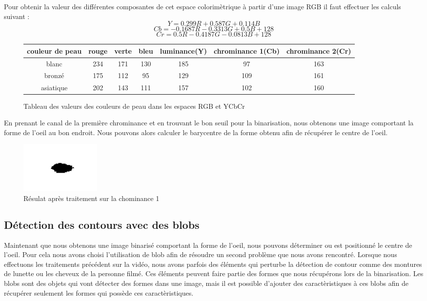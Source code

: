 Pour obtenir la valeur des différentes composantes de cet espace colorimètrique à partir
d'une image RGB il faut effectuer les calculs suivant :
$$Y = 0.299R + 0.587 G + 0.114 B$$
$$Cb = -0.1687R - 0.3313 G + 0.5B + 128$$
$$Cr = 0.5R -0.4187G -0.0813B + 128$$

\begin{figure}[H]
 \begin{tabular}{|c|c|c|c|c|c|c|}
  \hline
  couleur de peau & rouge & verte & bleu & luminance(Y) & chrominance 1(Cb) & chrominance 2(Cr)\\
  \hline
  blanc & 234 & 171 & 130 & 185 & 97 & 163 \\
  \hline
  bronzé & 175 & 112 & 95 & 129 & 109 & 161 \\
  \hline
  asiatique & 202 & 143 & 111 & 157 & 102 & 160\\
  \hline
 \end{tabular}
 \caption{Tableau des valeurs des couleurs de peau dans les espaces RGB et YCbCr}
\end{figure}


En prenant le canal de la première chrominance et en trouvant le bon seuil pour la binarisation,
nous obtenons une image comportant la forme de l'oeil au bon endroit. Nous pouvons alors calculer
le barycentre de la forme obtenu afin de récupérer le centre de l'oeil.

\begin{figure}[H]
 \center
 \includegraphics[width=4cm]{image/pupille.png}
 \caption{Résulat après traitement sur la chominance 1}
\end{figure}

\subsection{Détection des contours avec des blobs}
Maintenant que nous obtenons une image binarisé comportant la forme de l'oeil, nous pouvons déterminer ou est
positionné le centre de l'oeil. Pour cela nous avons choisi l'utilisation de blob afin de résoudre un second 
problème que nous avons rencontré. Lorsque nous effectuons les traitements précédent sur la vidéo, nous avons
parfois des éléments qui perturbe la détection de contour comme des montures de lunette ou les cheveux de la personne 
filmé. Ces éléments peuvent faire partie des formes que nous récupérons lors de la binarisation. Les blobs
sont des objets qui vont détecter des formes dans une image, mais il est possible d'ajouter des caractèristiques
à ces blobs afin de récupérer seulement les formes qui possède ces caractèristiques.\\

